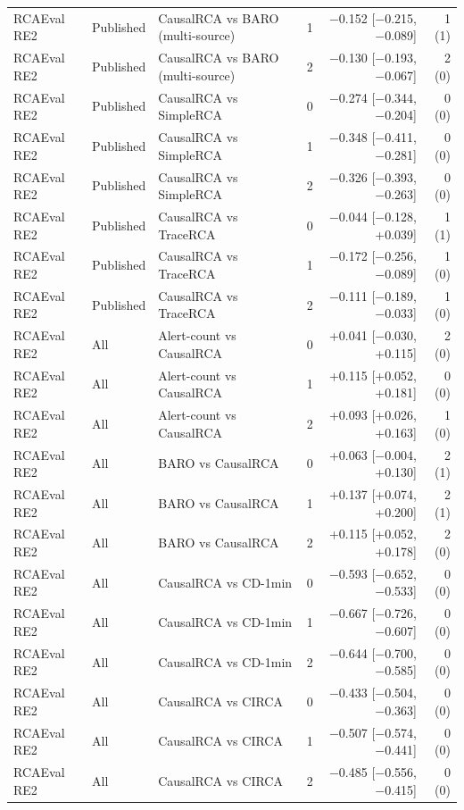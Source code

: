 {\begin{longtable}{llllrr}
RCAEval RE2 & Published & CausalRCA vs BARO (multi-source) & 1 & $-$0.152 [$-$0.215, $-$0.089] & 1 (1) \\
RCAEval RE2 & Published & CausalRCA vs BARO (multi-source) & 2 & $-$0.130 [$-$0.193, $-$0.067] & 2 (0) \\
RCAEval RE2 & Published & CausalRCA vs SimpleRCA & 0 & $-$0.274 [$-$0.344, $-$0.204] & 0 (0) \\
RCAEval RE2 & Published & CausalRCA vs SimpleRCA & 1 & $-$0.348 [$-$0.411, $-$0.281] & 0 (0) \\
RCAEval RE2 & Published & CausalRCA vs SimpleRCA & 2 & $-$0.326 [$-$0.393, $-$0.263] & 0 (0) \\
RCAEval RE2 & Published & CausalRCA vs TraceRCA & 0 & $-$0.044 [$-$0.128, +0.039] & 1 (1) \\
RCAEval RE2 & Published & CausalRCA vs TraceRCA & 1 & $-$0.172 [$-$0.256, $-$0.089] & 1 (0) \\
RCAEval RE2 & Published & CausalRCA vs TraceRCA & 2 & $-$0.111 [$-$0.189, $-$0.033] & 1 (0) \\
RCAEval RE2 & All & Alert-count vs CausalRCA & 0 & +0.041 [$-$0.030, +0.115] & 2 (0) \\
RCAEval RE2 & All & Alert-count vs CausalRCA & 1 & +0.115 [+0.052, +0.181] & 0 (0) \\
RCAEval RE2 & All & Alert-count vs CausalRCA & 2 & +0.093 [+0.026, +0.163] & 1 (0) \\
RCAEval RE2 & All & BARO vs CausalRCA & 0 & +0.063 [$-$0.004, +0.130] & 2 (1) \\
RCAEval RE2 & All & BARO vs CausalRCA & 1 & +0.137 [+0.074, +0.200] & 2 (1) \\
RCAEval RE2 & All & BARO vs CausalRCA & 2 & +0.115 [+0.052, +0.178] & 2 (0) \\
RCAEval RE2 & All & CausalRCA vs CD-1min & 0 & $-$0.593 [$-$0.652, $-$0.533] & 0 (0) \\
RCAEval RE2 & All & CausalRCA vs CD-1min & 1 & $-$0.667 [$-$0.726, $-$0.607] & 0 (0) \\
RCAEval RE2 & All & CausalRCA vs CD-1min & 2 & $-$0.644 [$-$0.700, $-$0.585] & 0 (0) \\
RCAEval RE2 & All & CausalRCA vs CIRCA & 0 & $-$0.433 [$-$0.504, $-$0.363] & 0 (0) \\
RCAEval RE2 & All & CausalRCA vs CIRCA & 1 & $-$0.507 [$-$0.574, $-$0.441] & 0 (0) \\
RCAEval RE2 & All & CausalRCA vs CIRCA & 2 & $-$0.485 [$-$0.556, $-$0.415] & 0 (0) \\

\end{longtable}}
